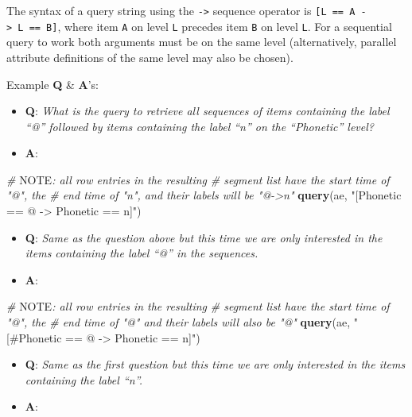 \documentclass[]{book}
\newenvironment{Shaded}{\begin{snugshade}}{\end{snugshade}}
\newcommand{\AlertTok}[1]{\textcolor[rgb]{0.94,0.16,0.16}{#1}}
\newcommand{\CommentTok}[1]{\textcolor[rgb]{0.56,0.35,0.01}{\textit{#1}}}
\newcommand{\KeywordTok}[1]{\textcolor[rgb]{0.13,0.29,0.53}{\textbf{#1}}}
\newcommand{\NormalTok}[1]{#1}
\newcommand{\StringTok}[1]{\textcolor[rgb]{0.31,0.60,0.02}{#1}}
\providecommand{\tightlist}{%
  \setlength{\itemsep}{0pt}\setlength{\parskip}{0pt}}
\theoremstyle{definition}
\theoremstyle{definition}
\theoremstyle{definition}
\theoremstyle{remark}
\begin{document}
The syntax of a query string using the \texttt{-\textgreater{}} sequence
operator is \texttt{{[}L\ ==\ A\ -\textgreater{}\ L\ ==\ B{]}}, where
item \texttt{A} on level \texttt{L} precedes item \texttt{B} on level
\texttt{L}. For a sequential query to work both arguments must be on the
same level (alternatively, parallel attribute definitions of the same
level may also be chosen).

Example \textbf{Q} \& \textbf{A}'s:

\begin{itemize}
\tightlist
\item
  \textbf{Q}: \emph{What is the query to retrieve all sequences of items
  containing the label ``@'' followed by items containing the label
  ``n'' on the ``Phonetic'' level?}
\item
  \textbf{A}:
\end{itemize}

\begin{Shaded}
\begin{Highlighting}[]
\CommentTok{# }\AlertTok{NOTE}\CommentTok{: all row entries in the resulting }
\CommentTok{# segment list have the start time of "@", the }
\CommentTok{# end time of "n", and their labels will be "@->n"}
\KeywordTok{query}\NormalTok{(ae, }\StringTok{"[Phonetic == @ -> Phonetic == n]"}\NormalTok{)}
\end{Highlighting}
\end{Shaded}

\begin{itemize}
\tightlist
\item
  \textbf{Q}: \emph{Same as the question above but this time we are only
  interested in the items containing the label ``@'' in the sequences.}
\item
  \textbf{A}:
\end{itemize}

\begin{Shaded}
\begin{Highlighting}[]
\CommentTok{# }\AlertTok{NOTE}\CommentTok{: all row entries in the resulting}
\CommentTok{# segment list have the start time of "@", the}
\CommentTok{# end time of "@" and their labels will also be "@"}
\KeywordTok{query}\NormalTok{(ae, }\StringTok{"[#Phonetic == @ -> Phonetic == n]"}\NormalTok{)}
\end{Highlighting}
\end{Shaded}

\begin{itemize}
\tightlist
\item
  \textbf{Q}: \emph{Same as the first question but this time we are only
  interested in the items containing the label ``n''.}
\item
  \textbf{A}:
\end{itemize}
\end{document}
